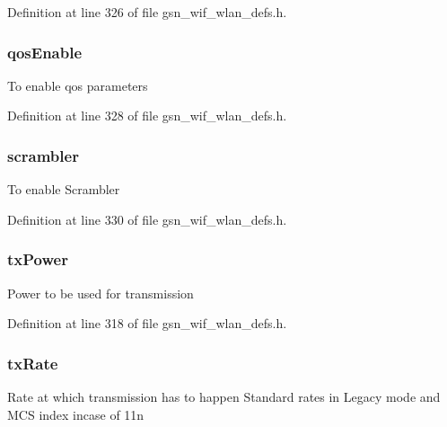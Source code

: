 Definition at line 326 of file gsn\_\-wif\_\-wlan\_\-defs.h.

\hypertarget{a00187_a701726914e266e9ac77130d4b4f9f809}{
\subsubsection[{qosEnable}]{ {\bf qosEnable}}}
\label{a00187_a701726914e266e9ac77130d4b4f9f809}
To enable qos parameters 

Definition at line 328 of file gsn\_\-wif\_\-wlan\_\-defs.h.

\hypertarget{a00187_a808943286ddbb9bc1773a11a1f2c7cb3}{
\subsubsection[{scrambler}]{ {\bf scrambler}}}
\label{a00187_a808943286ddbb9bc1773a11a1f2c7cb3}
To enable Scrambler 

Definition at line 330 of file gsn\_\-wif\_\-wlan\_\-defs.h.

\hypertarget{a00187_a763a8a049f451428e05835d3c3b466cd}{
\subsubsection[{txPower}]{ {\bf txPower}}}
\label{a00187_a763a8a049f451428e05835d3c3b466cd}
Power to be used for transmission 

Definition at line 318 of file gsn\_\-wif\_\-wlan\_\-defs.h.

\hypertarget{a00187_ab1ab70812caf37881581c451398a6f9c}{
\subsubsection[{txRate}]{ {\bf txRate}}}
\label{a00187_ab1ab70812caf37881581c451398a6f9c}
Rate at which transmission has to happen Standard rates in Legacy mode and MCS index incase of 11n 

